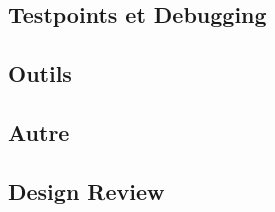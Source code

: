 \subsection{Testpoints et Debugging}

\subsection{Outils}

\subsection{Autre}

\subsection{Design Review}
